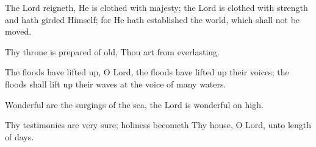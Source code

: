 The Lord reigneth, He is clothed with majesty; the Lord is clothed with strength and hath girded Himself; for He hath established the world, which shall not be moved.

Thy throne is prepared of old, Thou art from everlasting.

The floods have lifted up, O Lord, the floods have lifted up their voices; the floods shall lift up their waves at the voice of many waters.

Wonderful are the surgings of the sea, the Lord is wonderful on high.

Thy testimonies are very sure; holiness becometh Thy house, O Lord, unto length of days.

